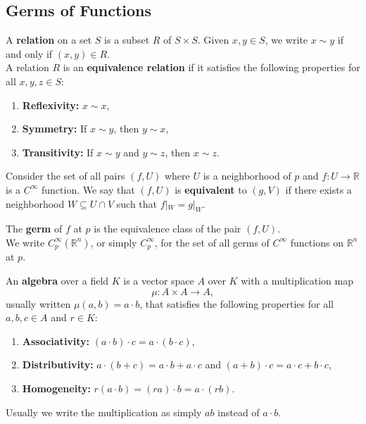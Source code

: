 \documentclass[en, oneside]{vivi}
\begin{document}
\subsection{Germs of Functions}
\begin{dfn}
    A \textbf{relation} on a set $S$ is a subset $R$ of $S \times S$. Given $x, y \in S$, we write $x \sim y$ if and only if $(x, y) \in R$.\\
    A relation $R$ is an \textbf{equivalence relation} if it satisfies the following properties for all $x, y, z \in S$:
    \begin{enumerate}[label=(\roman*)]
        \item \textbf{Reflexivity:} $x \sim x$,
        \item \textbf{Symmetry:} If $x \sim y$, then $y \sim x$,
        \item \textbf{Transitivity:} If $x \sim y$ and $y \sim z$, then $x \sim z$.
    \end{enumerate}
\end{dfn}
Consider the set of all pairs $(f, U)$ where $U$ is a neighborhood of $p$ and $f: U \to \mathbb{R}$ is a $C^\infty$ function. 
We say that $(f, U)$ is \textbf{equivalent} to $(g, V)$ if there exists a neighborhood $W \subseteq U \cap V$ such that $f|_W = g|_W$.
\begin{dfn}
    The \textbf{germ} of $f$ at $p$ is the equivalence class of the pair $(f, U)$.\\
    We write $C_p^\infty(\mathbb{R}^n)$, or simply $C^\infty_p$, for the set of all germs of $C^\infty$ functions on $\mathbb{R}^n$ at $p$.
\end{dfn}
\begin{dfn}
    An \textbf{algebra} over a field $K$ is a vector space $A$ over $K$ with a multiplication map
    \begin{equation*}
        \mu: A \times A \to A,
    \end{equation*}
    usually written $\mu(a, b) = a \cdot b$, that satisfies the following properties for all $a, b, c \in A$ and $r \in K$:
    \begin{enumerate}[label=(\roman*)]
        \item \textbf{Associativity:} $(a \cdot b) \cdot c = a \cdot (b \cdot c)$,
        \item \textbf{Distributivity:} $a \cdot (b + c) = a \cdot b + a \cdot c$ and $(a + b) \cdot c = a \cdot c + b \cdot c$,
        \item \textbf{Homogeneity:} $r(a \cdot b) = (ra) \cdot b = a \cdot (rb)$.
    \end{enumerate}
    Usually we write the multiplication as simply $a b$ instead of $a \cdot b$.
\end{dfn}
\end{document}
